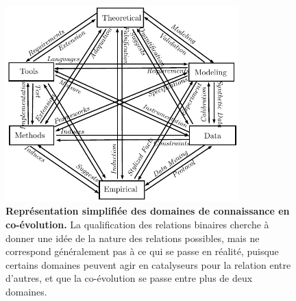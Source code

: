 \begin{figure}%
\centering
\includegraphics[width=0.8\textwidth]{figures/epistemo_tqg}
\caption{\textbf{Représentation simplifiée des domaines de connaissance en co-évolution.} La qualification des relations binaires cherche à donner une idée de la nature des relations possibles, mais ne correspond généralement pas à ce qui se passe en réalité, puisque certains domaines peuvent agir en catalyseurs pour la relation entre d'autres, et que la co-évolution se passe entre plus de deux domaines.}
\label{fig:clustering}
\end{figure}













